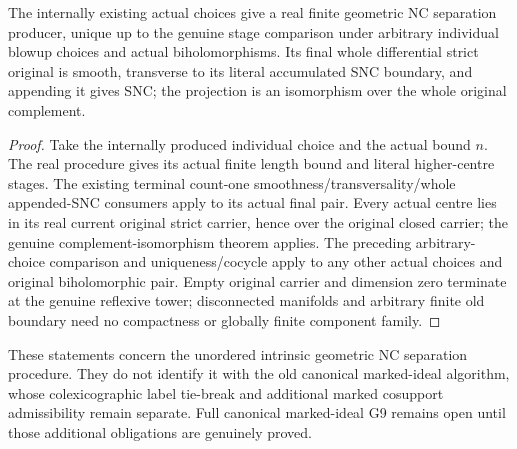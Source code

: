 \begin{theorem}
\label{hir:general-nc-internally-natural-geometric-separation}
\leanok
The internally existing actual choices give a real finite geometric
NC separation producer, unique up to the genuine stage comparison
under arbitrary individual blowup choices and actual biholomorphisms.
Its final whole differential strict original is smooth, transverse to
its literal accumulated SNC boundary, and appending it gives SNC;
the projection is an isomorphism over the whole original complement.
\end{theorem}
\begin{proof}
Take the internally produced individual choice and the actual bound
$n$. The real procedure gives its actual finite length bound and
literal higher-centre stages. The existing terminal count-one
smoothness/transversality/whole appended-SNC consumers apply to its
actual final pair. Every actual centre lies in its real current
original strict carrier, hence over the original closed carrier;
the genuine complement-isomorphism theorem applies. The preceding
arbitrary-choice comparison and uniqueness/cocycle apply to any
other actual choices and original biholomorphic pair. Empty original
carrier and dimension zero terminate at the genuine reflexive tower;
disconnected manifolds and arbitrary finite old boundary need no
compactness or globally finite component family.
\end{proof}

\begin{remark}
These statements concern the unordered intrinsic geometric NC separation
procedure. They do not identify it with the old canonical marked-ideal
algorithm, whose colexicographic label tie-break and additional marked
cosupport admissibility remain separate. Full canonical marked-ideal
G9 remains open until those additional obligations are genuinely proved.
\end{remark}
